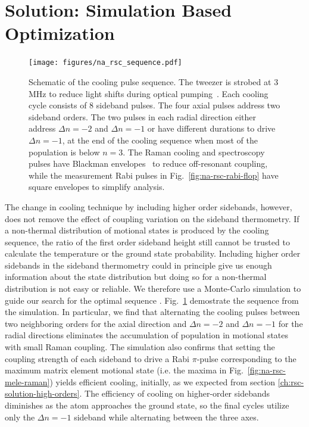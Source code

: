 \section{Solution: Simulation Based Optimization}

\begin{figure}
  \centering
  \texttt{[image: figures/na\_rsc\_sequence.pdf]}
  \caption[Simulation optimized Raman sideband cooling sequence for Sodium]{
    Schematic of the cooling pulse sequence. The tweezer is strobed at 3 MHz to
    reduce light shifts during optical pumping~\cite{hutzler_eliminating_2017}.
    Each cooling cycle consists of $8$ sideband pulses.
    The four axial pulses address two sideband orders.
    The two pulses in each radial direction either address $\Delta n=-2$ and $\Delta n=-1$
    or have different durations to drive $\Delta n=-1$,
    at the end of the cooling sequence when most of the population is below $n=3$.
    The Raman cooling and spectroscopy pulses have Blackman envelopes~\cite{kasevich_laser_1992}
    to reduce off-resonant coupling,
    while the measurement Rabi pulses in Fig.~\ref{fig:na-rsc-rabi-flop}
    have square envelopes to simplify analysis.
    \label{fig:na-rsc-sequence}}
\end{figure}

The change in cooling technique by including higher order sidebands, however,
does not remove the effect of coupling variation on the sideband thermometry.
If a non-thermal distribution of motional states is produced by the cooling sequence,
the ratio of the first order sideband height still cannot be trusted to calculate
the temperature or the ground state probability.
Including higher order sidebands in the sideband thermometry could in principle
give us enough information about the state distribution but doing
so for a non-thermal distribution is not easy or reliable.
We therefore use a Monte-Carlo simulation to guide our search
for the optimal sequence \todo{\cite{}}.
Fig.~\ref{fig:na-rsc-sequence} demostrate the sequence from the simulation.
In particular, we find that alternating the cooling pulses between two
neighboring orders for the axial direction and $\Delta n=-2$ and $\Delta n=-1$
for the radial directions
eliminates the accumulation of population in motional states with small Raman coupling.
The simulation also confirms that setting the coupling strength of each sideband
to drive a Rabi $\pi$-pulse corresponding to the maximum matrix element motional state
(i.e. the maxima in Fig.~\ref{fig:na-rsc-mele-raman}) yields efficient cooling, initially,
as we expected from section \ref{ch:rsc-solution-high-orders}.
The efficiency of cooling on higher-order sidebands diminishes
as the atom approaches the ground state, so the final cycles utilize only
the $\Delta n=-1$ sideband while alternating between the three axes.

